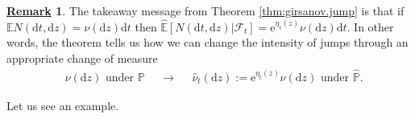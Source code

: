 \documentclass[12pt]{book}
\let\varepsilon\epsilon
\numberwithin{equation}{chapter}
\theoremstyle{plain}
\newtheorem{theorem}{\underline{Theorem}}
\numberwithin{theorem}{section}
\theoremstyle{definition}
\newtheorem{remark}[theorem]{\underline{Remark}}
\numberwithin{exercise}{chapter}
\let\oldendproof\endproof
\renewenvironment{proof}[1][\proofname]{%
  \oldproof[\scshape\underline{#1}]%
}{\oldendproof}
\newcommand{\<}{\langle}
\renewcommand{\>}{\rangle}
\renewcommand{\(}{\left(}
\renewcommand{\)}{\right)}
\renewcommand{\[}{\left[}
\renewcommand{\]}{\right]}
\newcommand\Eb{\mathds{E}}
\newcommand\Pb{\mathds{P}}
\newcommand\Rb{\mathds{R}}
\newcommand\Fc{\mathscr{F}}
\newcommand\eps{\varepsilon}
\newcommand\Om{\Omega}
\newcommand\gam{\gamma}
\newcommand\Pbh{\widehat{\Pb}}
\newcommand\Ebh{\widehat{\Eb}}
\newcommand\Wh{\widehat{W}}
\newcommand\Nh{\widehat{N}}
\newcommand\nuh{\widehat{\nu}}
\newcommand\Nt{\widetilde{N}}
\newcommand\dd{\mathrm{d}}
\newcommand\ee{\mathrm{e}}
\begin{document}
\begin{remark}
\label{rmk:intensity}
The takeaway message from Theorem \ref{thm:girsanov.jump} is that if $\Eb N(\dd t,\dd z) = \nu(\dd z) \dd t$ then $\Ebh[ N(\dd t, \dd z)| \Fc_t ] = \ee^{\eta_t(z)} \nu(\dd z) \dd t$. In other words, the theorem tells us how we can change the intensity of jumps through an appropriate change of measure
\begin{align}
	&\text{$\nu(\dd z)$ under $\Pb$}&
	&\to &
	&\text{$\nuh_t(\dd z) := \ee^{\eta_t(z)} \nu(\dd z)$ under $\Pbh$}.
\end{align}
\end{remark}

\noindent
Let us see an example.

%
\end{document}
